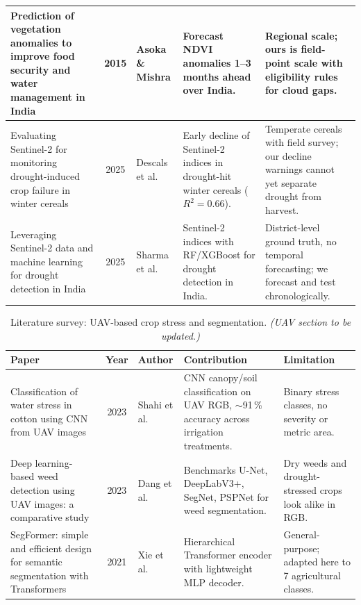 \documentclass[11pt,a4paper,oneside]{article}
\renewcommand{\arraystretch}{1.0}
\begin{document}
\begin{table}[H]
\begin{tabularx}{\textwidth}{@{}p{3.1cm}|c|p{2.2cm}|X|X@{}}
\hline
Prediction of vegetation anomalies to improve food security and water management in India~\cite{asoka2015} & 2015 & Asoka \& Mishra & Forecast NDVI anomalies 1--3 months ahead over India. & Regional scale; ours is field-point scale with eligibility rules for cloud gaps. \\
\hline
Evaluating Sentinel-2 for monitoring drought-induced crop failure in winter cereals~\cite{descals2025} & 2025 & Descals et al. & Early decline of Sentinel-2 indices in drought-hit winter cereals ($R^2 = 0.66$). & Temperate cereals with field survey; our decline warnings cannot yet separate drought from harvest. \\
\hline
Leveraging Sentinel-2 data and machine learning for drought detection in India~\cite{sharma2025} & 2025 & Sharma et al. & Sentinel-2 indices with RF/XGBoost for drought detection in India. & District-level ground truth, no temporal forecasting; we forecast and test chronologically. \\
\hline
\end{tabularx}
\end{table}

\begin{table}[H]
\centering
\caption{Literature survey: UAV-based crop stress and segmentation. \textit{(UAV section to be updated.)}}
\label{tab:lit_uav}
\scriptsize
\renewcommand{\arraystretch}{1.05}
\begin{tabularx}{\textwidth}{@{}p{3.1cm}|c|p{2.2cm}|X|X@{}}
\hline
\textbf{Paper} & \textbf{Year} & \textbf{Author} & \textbf{Contribution} & \textbf{Limitation} \\
\hline
Classification of water stress in cotton using CNN from UAV images~\cite{shahi2023} & 2023 & Shahi et al. & CNN canopy/soil classification on UAV RGB, $\sim$91\,\% accuracy across irrigation treatments. & Binary stress classes, no severity or metric area. \\
\hline
Deep learning-based weed detection using UAV images: a comparative study~\cite{dang2023} & 2023 & Dang et al. & Benchmarks U-Net, DeepLabV3+, SegNet, PSPNet for weed segmentation. & Dry weeds and drought-stressed crops look alike in RGB. \\
\hline
SegFormer: simple and efficient design for semantic segmentation with Transformers~\cite{segformer2021} & 2021 & Xie et al. & Hierarchical Transformer encoder with lightweight MLP decoder. & General-purpose; adapted here to 7 agricultural classes. \\
\hline
\end{tabularx}
\end{table}
\end{document}
